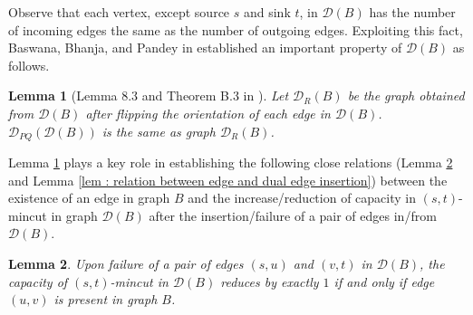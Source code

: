 \documentclass[letterpaper,11pt]{article}
\newtheorem{lemma}{Lemma}[]
\begin{document}
Observe that each vertex, except source $s$ and sink $t$, in ${\mathcal D}(B)$ has the number of incoming edges the same as the number of outgoing edges. Exploiting this fact, Baswana, Bhanja, and Pandey in \cite{DBLP:journals/talg/BaswanaBP23} established an important property of ${\mathcal D}(B)$ as follows.
\begin{lemma}[Lemma 8.3 and Theorem B.3 in \cite{DBLP:journals/talg/BaswanaBP23}] \label{lem : D_PQ is same as D}
    Let ${\mathcal D}_{R}(B)$ be the graph obtained from ${\mathcal D}(B)$ after flipping the orientation of each edge in ${\mathcal D}(B)$. ${\mathcal D}_{PQ}({\mathcal D}(B))$ is the same as graph ${\mathcal D}_R(B)$.
\end{lemma}
Lemma \ref{lem : D_PQ is same as D} plays a key role in establishing the following close relations (Lemma \ref{lem : relation between edge and dual edge failure} and Lemma \ref{lem : relation between edge and dual edge insertion}) between the existence of an edge in graph $B$ and the increase/reduction of capacity in $(s,t)$-mincut in graph ${\mathcal D}(B)$ after the insertion/failure of a pair of edges in/from ${\mathcal D}(B)$. 
\begin{lemma} \label{lem : relation between edge and dual edge failure}
    Upon failure of a pair of edges $(s,u)$ and $(v,t)$ in ${\mathcal D}(B)$, the capacity of $(s,t)$-mincut in ${\mathcal D}(B)$ reduces by exactly $1$ if and only if edge $(u,v)$ is present in graph $B$. 
\end{lemma}
\end{document}
